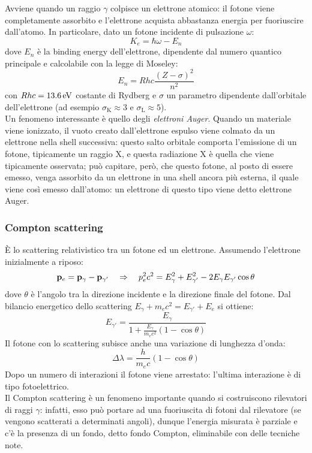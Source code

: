 Avviene quando un raggio $ \gamma $ colpisce un elettrone atomico: il fotone viene completamente assorbito e l'elettrone acquista abbastanza energia per fuoriuscire dall'atomo. In particolare, dato un fotone incidente di pulsazione $ \omega $:
\begin{equation}
	K_e = \hbar \omega - E_n
	\label{eq:3.9}
\end{equation}
dove $ E_n $ è la binding energy dell'elettrone, dipendente dal numero quantico principale e calcolabile con la legge di Moseley:
\begin{equation}
	E_n = Rhc \frac{(Z - \sigma)^2}{n^2}
	\label{eq:3.10}
\end{equation}
con $ Rhc = 13.6 \,\mathrm{eV} $ costante di Rydberg e $ \sigma $ un parametro dipendente dall'orbitale dell'elettrone (ad esempio $ \sigma_{\text{K}} \approx 3 $ e $ \sigma_{\text{L}} \approx 5 $).\\
Un fenomeno interessante è quello degli \textit{elettroni Auger}. Quando un materiale viene ionizzato, il vuoto creato dall'elettrone espulso viene colmato da un elettrone nella shell successiva: questo salto orbitale comporta l'emissione di un fotone, tipicamente un raggio X, e questa radiazione X è quella che viene tipicamente osservata; può capitare, però, che questo fotone, al posto di essere emesso, venga assorbito da un elettrone in una shell ancora più esterna, il quale viene così emesso dall'atomo: un elettrone di questo tipo viene detto elettrone Auger.

\subsubsection{Compton scattering}

È lo scattering relativistico tra un fotone ed un elettrone. Assumendo l'elettrone inizialmente a riposo:
\begin{equation*}
	\mathbf{p}_e = \mathbf{p}_{\gamma} - \mathbf{p}_{\gamma'} \quad\Rightarrow\quad p_e^2 c^2 = E_{\gamma}^2 + E_{\gamma'}^2 - 2E_{\gamma} E_{\gamma'} \cos \theta
\end{equation*}
dove $ \theta $ è l'angolo tra la direzione incidente e la direzione finale del fotone. Dal bilancio energetico dello scattering $ E_{\gamma} + m_e c^2 = E_{\gamma'} + E_e $ si ottiene:
\begin{equation}
	E_{\gamma'} = \frac{E_{\gamma}}{1 + \frac{E_{\gamma}}{m_e c^2} (1 - \cos \theta)}
	\label{eq:3.11}
\end{equation}
Il fotone con lo scattering subisce anche una variazione di lunghezza d'onda:
\begin{equation}
	\Delta \lambda = \frac{h}{m_e c} (1 - \cos \theta)
	\label{eq:3.12}
\end{equation}
Dopo un numero di interazioni il fotone viene arrestato: l'ultima interazione è di tipo fotoelettrico.\\
Il Compton scattering è un fenomeno importante quando si costruiscono rilevatori di raggi $ \gamma $: infatti, esso può portare ad una fuoriuscita di fotoni dal rilevatore (se vengono scatterati a determinati angoli), dunque l'energia misurata è parziale e c'è la presenza di un fondo, detto fondo Compton, eliminabile con delle tecniche note.

